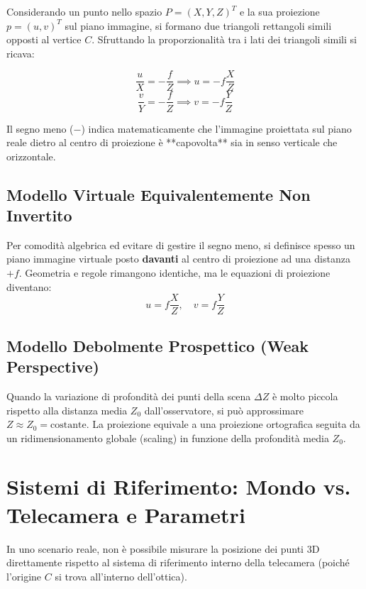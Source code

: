 Considerando un punto nello spazio $P = (X, Y, Z)^T$ e la sua proiezione $p = (u, v)^T$ sul piano immagine, si formano due triangoli rettangoli simili opposti al vertice $C$. Sfruttando la proporzionalità tra i lati dei triangoli simili si ricava:

\begin{equation}
    \frac{u}{X} = -\frac{f}{Z} \implies u = -f \frac{X}{Z}
\end{equation}
\begin{equation}
    \frac{v}{Y} = -\frac{f}{Z} \implies v = -f \frac{Y}{Z}
\end{equation}

Il segno meno ($-$) indica matematicamente che l'immagine proiettata sul piano reale dietro al centro di proiezione è **capovolta** sia in senso verticale che orizzontale.

\subsection{Modello Virtuale Equivalentemente Non Invertito}
Per comodità algebrica ed evitare di gestire il segno meno, si definisce spesso un piano immagine virtuale posto \textbf{davanti} al centro di proiezione ad una distanza $+f$. Geometria e regole rimangono identiche, ma le equazioni di proiezione diventano:
\begin{equation}
    u = f \frac{X}{Z}, \quad v = f \frac{Y}{Z}
\end{equation}

\subsection{Modello Debolmente Prospettico (Weak Perspective)}
Quando la variazione di profondità dei punti della scena $\Delta Z$ è molto piccola rispetto alla distanza media $Z_0$ dall'osservatore, si può approssimare $Z \approx Z_0 = \text{costante}$. La proiezione equivale a una proiezione ortografica seguita da un ridimensionamento globale (scaling) in funzione della profondità media $Z_0$.

\section{Sistemi di Riferimento: Mondo vs. Telecamera e Parametri}
In uno scenario reale, non è possibile misurare la posizione dei punti $3\text{D}$ direttamente rispetto al sistema di riferimento interno della telecamera (poiché l'origine $C$ si trova all'interno dell'ottica). 

